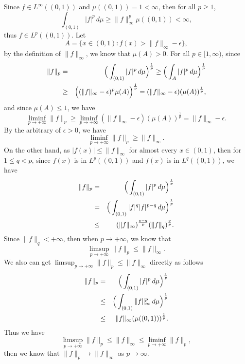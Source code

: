 \documentclass[12pt,a4paper]{ctexart}
\begin{document}
Since $f \in L^{\infty} ((0,1))$ and $\mu((0, 1)) = 1 < \infty$, then for all $p \geq 1$,
$$\int_{(0,1)} |f|^p \, d \mu \geq \|f\|_{\infty}^p \mu((0,1)) < \infty,$$
thus $f \in L^{p}((0, 1))$. Let
$$A = \{x \in (0,1): f(x) > \|f\|_{\infty} - \epsilon \},$$
by the definition of $\|f\|_{\infty}$, we know that $\mu(A) > 0$. For all $p \in [1, \infty)$, since
\begin{eqnarray*}
\|f\|_{p} & = & \Big{(} \int_{(0, 1)}^{} |f|^{p} \, d \mu \Big{)}^{\frac{1}{p}} \geq \Big{(} \int_{A}^{} |f|^{p} \, d \mu \Big{)}^{\frac{1}{p}} \\
& \geq & \Big{(} (\|f\|_{\infty} - \epsilon)^{p} \mu(A)\Big{)}^{\frac{1}{p}} = (\|f\|_{\infty} - \epsilon) (\mu(A))^{\frac{1}{p}},
\end{eqnarray*}
and since $\mu(A) \leq 1$, we have
\begin{equation*}
   \liminf_{p \to + \infty} \|f\|_{p} \geq \liminf_{p \to + \infty} (\|f\|_{\infty} - \epsilon) (\mu(A))^{\frac{1}{p}} = \|f\|_{\infty} - \epsilon.
\end{equation*}
By the arbitrary of $\epsilon > 0$, we have
\begin{equation*}
   \liminf_{p \to + \infty} \|f\|_{p} \geq \|f \|_{\infty} .
\end{equation*}
On the other hand, as $|f(x)| \leq \|f\|_{\infty}$ for almost every $x \in (0, 1)$, then for $1 \leq q < p$, since $f(x)$ is in $L^{p}((0, 1))$ and $f(x)$ is in $L^{q}((0, 1))$, we have
\begin{eqnarray*}
\|f\|_{p} & = & \Big{(} \int_{(0, 1)}^{} |f|^{p} \, d \mu \Big{)}^{\frac{1}{p}} \\
& = & \Big{(} \int_{(0, 1)}^{} |f|^{q} |f|^{p - q} \, d \mu \Big{)}^{\frac{1}{p}} \\
& \leq & (\|f\|_{\infty})^{\frac{p - q}{p}} (\|f\|_{q})^{\frac{q}{p}}.
\end{eqnarray*}
Since $\|f\|_{q} < + \infty$, then when $p \to + \infty$, we know that
\begin{equation*}
   \limsup_{p \to + \infty} \|f\|_{p} \leq \|f \|_{\infty} .
\end{equation*}
We also can get $\limsup_{p \to + \infty} \|f\|_{p} \leq \|f \|_{\infty}$ directly as follows
\begin{eqnarray*}
\|f\|_{p} & = & \Big{(} \int_{(0, 1)}^{} |f|^{p} \, d \mu \Big{)}^{\frac{1}{p}} \\
& \leq  & \Big{(} \int_{(0, 1)}^{} \|f\|_{\infty}^p \, d \mu \Big{)}^{\frac{1}{p}} \\
& \leq & \|f\|_{\infty} (\mu((0,1)))^{\frac{1}{p}}.
\end{eqnarray*}
Thus we have
\begin{equation*}
   \limsup_{p \to + \infty} \|f\|_{p} \leq \|f \|_{\infty} \leq \liminf_{p \to + \infty} \|f\|_{p},
\end{equation*}
then we know that $\|f \|_{p} \rightarrow \|f \|_{\infty}$ as $p \rightarrow \infty$.
\end{document}
